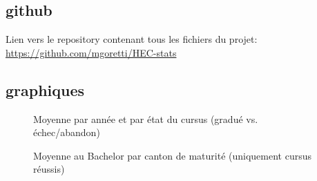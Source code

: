 \subsection{github}
Lien vers le repository contenant tous les fichiers du projet: \url{https://github.com/mgoretti/HEC-stats}

\subsection{graphiques}
\begin{figure}[H]
\caption{Moyenne par année et par état du cursus (gradué vs. échec/abandon)}
\label{fig:moyenne}
\end{figure}


\begin{figure}[H]
\caption{Moyenne au Bachelor par canton de maturité (uniquement cursus réussis)}
\label{fig:canton}
\end{figure}

